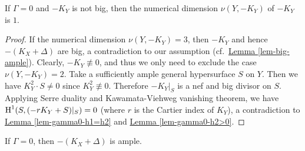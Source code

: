 \begin{lemme}\label{lem-gamma0-nu1}
If $\Gamma=0$ and $-K_Y$ is not big, then the numerical dimension  $\nu(Y,-K_Y)$ of $-K_Y$ is $1$.
\end{lemme}
\begin{proof}
If the numerical dimension $\nu(Y,-K_Y)=3$, then $-K_Y$ and hence $-(K_X+\Delta)$ are big, a contradiction to our assumption (cf.~{\hyperref[lem-big-ample]{Lemma \ref*{lem-big-ample}}}).
Clearly, $-K_Y\not\equiv0$, and thus we only need to exclude the case $\nu(Y,-K_Y)=2$.
Take a sufficiently ample general hypersurface $S$ on $Y$.
Then we have $K_Y^2\cdot S\neq 0$ since $K_Y^2\not\equiv 0$.
Therefore $-K_Y|_S$ is a nef and big divisor on $S$.
Applying Serre duality and Kawamata-Viehweg vanishing theorem, we have $\operatorname{H}^1(S,(-rK_Y+S)|_S)=0$ (where $r$ is the Cartier index of $K_Y$),  a contradiction to 
{\hyperref[lem-gamma0-h1=h2]{Lemma  \ref*{lem-gamma0-h1=h2}}} and 
{\hyperref[lem-gamma0-h2>0]{Lemma  \ref*{lem-gamma0-h2>0}}}. 
\end{proof}



\begin{thm}\label{thm-case-gamma=0}
If $\Gamma=0$, then $-(K_X+\Delta)$ is ample.	
\end{thm}

